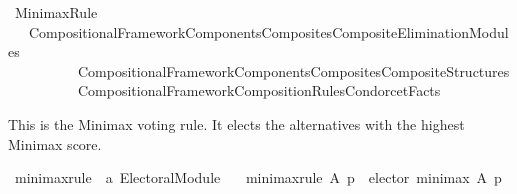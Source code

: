 %
\begin{isabellebody}%
%
%
\isadelimdocument
\isanewline
%
\endisadelimdocument
%
\isatagdocument
\isanewline
%
\isamarkuptrue%
%
\endisatagdocument
{\isafolddocument}%
%
\isadelimdocument
%
\endisadelimdocument
%
\isadelimtheory
%
\endisadelimtheory
%
\isatagtheory
{}\isamarkupfalse%
\ Minimax{\isacharunderscore}{\kern0pt}Rule\isanewline
\ \ \ {\isachardoublequoteopen}{\isachardot}{\kern0pt}{\isachardot}{\kern0pt}{\isacharslash}{\kern0pt}Compositional{\isacharunderscore}{\kern0pt}Framework{\isacharslash}{\kern0pt}Components{\isacharslash}{\kern0pt}Composites{\isacharslash}{\kern0pt}Composite{\isacharunderscore}{\kern0pt}Elimination{\isacharunderscore}{\kern0pt}Modules{\isachardoublequoteclose}\isanewline
\ \ \ \ \ \ \ \ \ \ {\isachardoublequoteopen}{\isachardot}{\kern0pt}{\isachardot}{\kern0pt}{\isacharslash}{\kern0pt}Compositional{\isacharunderscore}{\kern0pt}Framework{\isacharslash}{\kern0pt}Components{\isacharslash}{\kern0pt}Composites{\isacharslash}{\kern0pt}Composite{\isacharunderscore}{\kern0pt}Structures{\isachardoublequoteclose}\isanewline
\ \ \ \ \ \ \ \ \ \ {\isachardoublequoteopen}{\isachardot}{\kern0pt}{\isachardot}{\kern0pt}{\isacharslash}{\kern0pt}Compositional{\isacharunderscore}{\kern0pt}Framework{\isacharslash}{\kern0pt}Composition{\isacharunderscore}{\kern0pt}Rules{\isacharslash}{\kern0pt}Condorcet{\isacharunderscore}{\kern0pt}Facts{\isachardoublequoteclose}\isanewline
\isanewline
{}%
\endisatagtheory
{\isafoldtheory}%
%
\isadelimtheory
%
\endisadelimtheory
%
\begin{isamarkuptext}%
This is the Minimax voting rule. It elects the alternatives with the highest
Minimax score.%
\end{isamarkuptext}\isamarkuptrue%
%
\isadelimdocument
%
\endisadelimdocument
%
\isatagdocument
%
\isamarkuptrue%
%
\endisatagdocument
{\isafolddocument}%
%
\isadelimdocument
%
\endisadelimdocument
{}\isamarkupfalse%
\ minimax{\isacharunderscore}{\kern0pt}rule\ {\isacharcolon}{\kern0pt}{\isacharcolon}{\kern0pt}\ {\isachardoublequoteopen}{\isacharprime}{\kern0pt}a\ Electoral{\isacharunderscore}{\kern0pt}Module{\isachardoublequoteclose}\ \isanewline
\ \ {\isachardoublequoteopen}minimax{\isacharunderscore}{\kern0pt}rule\ A\ p\ {\isacharequal}{\kern0pt}\ elector\ minimax\ A\ p{\isachardoublequoteclose}\isanewline
\isanewline
\isanewline
{}\isamarkupfalse%

\end{isabellebody}
